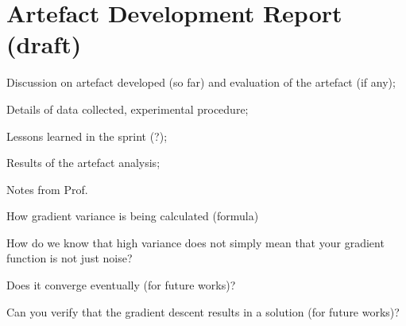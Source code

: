 \section{Artefact Development Report (draft)}
\begin{todolist}
    \item[\done] Discussion on artefact developed (so far) and evaluation of the artefact (if any);
    \item[\done] Details of data collected, experimental procedure;
    \item Lessons learned in the sprint (?);
    \item[\done] Results of the artefact analysis;
\end{todolist}

Notes from Prof.

\begin{todolist}
    \item[\done] How gradient variance is being calculated (formula)
    \item[\done] How do we know that high variance does not simply mean that your gradient function is not just noise?
    \item Does it converge eventually (for future works)?
    \item Can you verify that the gradient descent results in a solution (for future works)?
\end{todolist}




